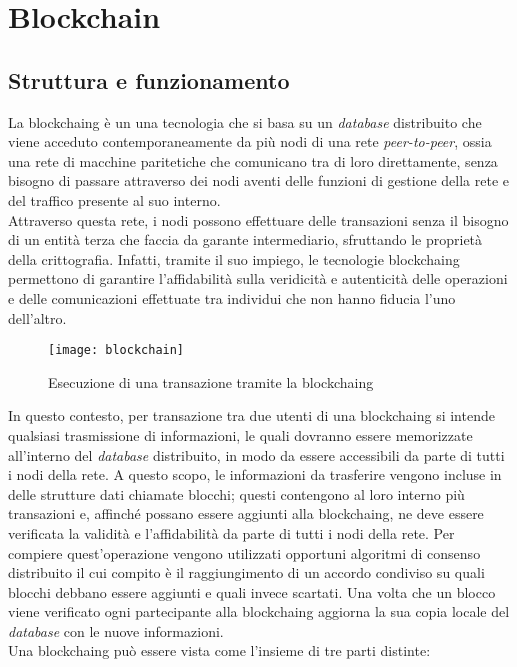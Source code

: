 
\chapter{Blockchain}
\label{cap:blockchain}

\section{Struttura e funzionamento}

La \gls{blockchaing} è un una tecnologia che si basa su un \textit{database} distribuito che viene acceduto contemporaneamente da più nodi di una rete \textit{peer-to-peer}, ossia una rete di macchine paritetiche che comunicano tra di loro direttamente, senza bisogno di passare attraverso dei nodi aventi delle funzioni di gestione della rete e del traffico presente al suo interno.\\
Attraverso questa rete, i nodi possono effettuare delle transazioni senza il bisogno di un entità terza che faccia da garante intermediario, sfruttando le proprietà della crittografia. Infatti, tramite il suo impiego, le tecnologie \gls{blockchaing} permettono di garantire l'affidabilità sulla veridicità e autenticità delle operazioni e delle comunicazioni effettuate tra individui che non hanno fiducia l'uno dell'altro.
\begin{figure}[H] 
	\centering 
	\texttt{[image: blockchain]} 
	\caption{Esecuzione di una transazione tramite la \gls{blockchaing}}
\end{figure}
\newpage
\noindent
In questo contesto, per transazione tra due utenti di una \gls{blockchaing} si intende qualsiasi trasmissione di informazioni, le quali dovranno essere memorizzate all'interno del \textit{database} distribuito, in modo da essere accessibili da parte di tutti i nodi della rete. A questo scopo, le informazioni da trasferire vengono incluse in delle strutture dati chiamate blocchi; questi contengono al loro interno più transazioni e, affinché possano essere aggiunti alla \gls{blockchaing}, ne deve essere verificata la validità e l'affidabilità da parte di tutti i nodi della rete. Per compiere quest'operazione vengono utilizzati opportuni algoritmi di consenso distribuito il cui compito è il raggiungimento di un accordo condiviso su quali blocchi debbano essere aggiunti e quali invece scartati. Una volta che un blocco viene verificato ogni partecipante alla \gls{blockchaing} aggiorna la sua copia locale del \textit{database} con le nuove informazioni.\\
Una \gls{blockchaing} può essere vista come l'insieme di tre parti distinte:

